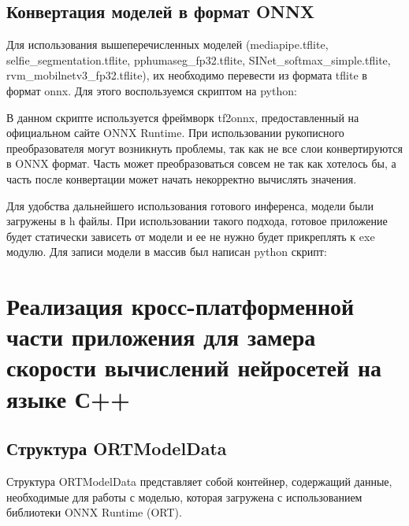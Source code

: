 \documentclass[a4paper,14pt]{extreport}
\begin{document}
        \section{Конвертация моделей в формат ONNX}
        Для использования вышеперечисленных моделей (mediapipe.tflite, selfie\_segmentation.tflite, pphumaseg\_fp32.tflite, SINet\_softmax\_simple.tflite, rvm\_mobilnetv3\_fp32.tflite), их необходимо перевести из формата tflite в формат onnx. Для этого воспользуемся скриптом на python:
        

        В данном скрипте используется фреймворк tf2onnx, предоставленный на официальном сайте ONNX Runtime. При использовании рукописного преобразователя могут возникнуть проблемы, так как не все слои конвертируются в ONNX формат. Часть может преобразоваться совсем не так как хотелось бы, а часть после конвертации может начать некорректно вычислять значения.

        \hypertarget{loader}{}Для удобства дальнейшего использования готового инференса, модели были загружены в h файлы. При использовании такого подхода, готовое приложение будет статически зависеть от модели и ее не нужно будет прикреплять к exe модулю. Для записи модели в массив был написан python скрипт:
        

    \chapter{Реализация кросс-платформенной части приложения для замера скорости вычислений нейросетей на языке С++}
        \section{Структура ORTModelData}
        Структура ORTModelData представляет собой контейнер, содержащий данные, необходимые для работы с моделью, которая загружена с использованием библиотеки ONNX Runtime (ORT).
        
\end{document}
